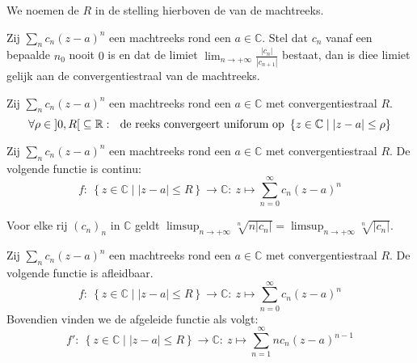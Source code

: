 \documentclass[main.tex]{subfiles}
\begin{document}

\begin{de}
  We noemen de $R$ in de stelling hierboven de  van de machtreeks.
\end{de}


\begin{bpr}
  Zij $\sum_{n}c_{n}(z-a)^{n}$ een machtreeks rond een $a\in \mathbb{C}$.
  Stel dat $c_{n}$ vanaf een bepaalde $n_{0}$ nooit $0$ is en dat de limiet $\lim_{n \rightarrow +\infty}\frac{|c_{n}|}{|c_{n+1}|}$ bestaat, dan is diee limiet gelijk aan de convergentiestraal van de machtreeks.
\end{bpr}


\begin{bst}
  Zij $\sum_{n}c_{n}(z-a)^{n}$ een machtreeks rond een $a\in \mathbb{C}$ met convergentiestraal $R$.
  \[ \forall \rho \in \interval[open]{0}{R} \subseteq \mathbb{R}:\ \text{ de reeks convergeert uniforum op } \left\{ z \in \mathbb{C} \mid |z-a| \le \rho \right\} \]
\end{bst}

\begin{bgev}
  Zij $\sum_{n}c_{n}(z-a)^{n}$ een machtreeks rond een $a\in \mathbb{C}$ met convergentiestraal $R$.
  De volgende functie is continu:
  \[ f:\ \left\{ z \in \mathbb{C} \mid |z-a| \le R \right\} \rightarrow \mathbb{C}:\ z \mapsto \sum_{n=0}^{\infty}c_{n}(z-a)^{n}  \]
\end{bgev}

\begin{blem}
  Voor elke rij $(c_{n})_{n}$ in $\mathbb{C}$ geldt $\limsup_{n\rightarrow +\infty}\sqrt[n]{n|c_{n}|} = \limsup_{n\rightarrow +\infty}\sqrt[n]{|c_{n}|}$.
\end{blem}

\begin{bst}
  Zij $\sum_{n}c_{n}(z-a)^{n}$ een machtreeks rond een $a\in \mathbb{C}$ met convergentiestraal $R$.
  De volgende functie is afleidbaar.
  \[ f:\ \left\{ z \in \mathbb{C} \mid |z-a| \le R \right\} \rightarrow \mathbb{C}:\ z \mapsto \sum_{n=0}^{\infty}c_{n}(z-a)^{n}  \]
  Bovendien vinden we de afgeleide functie als volgt:
  \[ f':\ \left\{ z \in \mathbb{C} \mid |z-a| \le R \right\} \rightarrow \mathbb{C}:\ z \mapsto \sum_{n=1}^{\infty}nc_{n}(z-a)^{n-1}  \]
\end{bst}
\end{document}
